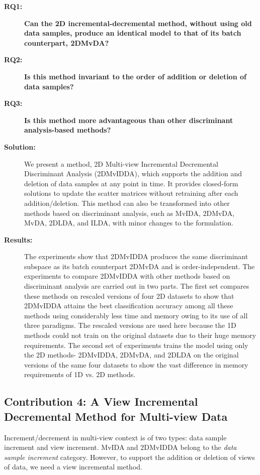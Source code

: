 \begin{description}
\item[\textbf{RQ1: }] \textbf{Can the 2D incremental-decremental method, without using old data samples, produce an identical model to that of its batch counterpart, 2DMvDA?}

\item[\textbf{RQ2: }] \textbf{Is this method invariant to the order of addition or deletion of data samples?}

\item[\textbf{RQ3: }] \textbf{Is this method more advantageous than other discriminant analysis-based methods?}

\item[\textbf{Solution:}] We present a method, 2D Multi-view Incremental Decremental Discriminant Analysis (2DMvIDDA), which supports the addition and deletion of data samples at any point in time. It provides closed-form solutions to update the scatter matrices without retraining after each addition/deletion. This method can also be transformed into other methods based on discriminant analysis, such as MvIDA, 2DMvDA, MvDA, 2DLDA, and ILDA, with minor changes to the formulation.

\item[\textbf{Results:}] The experiments show that 2DMvIDDA produces the same discriminant subspace as its batch counterpart 2DMvDA and is order-independent. The experiments to compare 2DMvIDDA with other methods based on discriminant analysis are carried out in two parts. The first set compares these methods on rescaled versions of four 2D datasets to show that 2DMvIDDA attains the best classification accuracy among all these methods using considerably less time and memory owing to its use of all three paradigms. The rescaled versions are used here because the 1D methods could not train on the original datasets due to their huge memory requirements. The second set of experiments trains the model using only the 2D methods- 2DMvIDDA, 2DMvDA, and 2DLDA on the original versions of the same four datasets to show the vast difference in memory requirements of 1D vs. 2D methods.
\end{description}



\subsection{Contribution 4: A View Incremental Decremental Method for Multi-view Data}
Increment/decrement in multi-view context is of two types: data sample increment and view increment. MvIDA and 2DMvIDDA belong to the \textit{data sample increment} category. However, to support the addition or deletion of views of data, we need a view incremental method.


